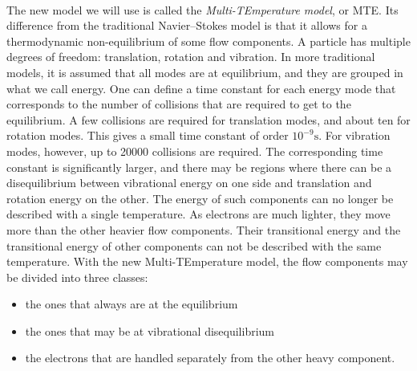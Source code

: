       \paragraph{}
      The new model we will use is called the \emph{Multi-TEmperature model}, or MTE.
      Its difference from the traditional Navier--Stokes model is that it allows for a thermodynamic non-equilibrium of some flow components.
      A particle has multiple degrees of freedom: translation, rotation and vibration.
      In more traditional models, it is assumed that all modes are at equilibrium, and they are grouped in what we call energy.
      One can define a time constant for each energy mode that corresponds to the number of collisions that are required to get to the equilibrium.
      A few collisions are required for translation modes, and about ten for rotation modes.
      This gives a small time constant of order $10^{-9} \si{\second}$.
      For vibration modes, however, up to \num{20000} collisions are required.
      The corresponding time constant is significantly larger, and there may be regions where there can be a disequilibrium between vibrational energy on one side and translation and rotation energy on the other.
      The energy of such components can no longer be described with a single temperature.
      As electrons are much lighter, they move more than the other heavier flow components.
      Their transitional energy and the transitional energy of other components can not be described with the same temperature.
      With the new Multi-TEmperature model, the flow components may be divided into three classes:
      \begin{itemize}
        \item the ones that always are at the equilibrium
        \item the ones that may be at vibrational disequilibrium
        \item the electrons that are handled separately from the other heavy component.
      \end{itemize}

